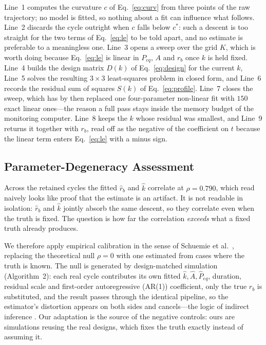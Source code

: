 \documentclass[runningheads]{llncs}
\newcommand{\rb}{\ensuremath{r_{b}}}
\newcommand{\rbh}{\ensuremath{\hat{r}_{b}}}
\newcommand{\kh}{\ensuremath{\hat{k}}}
\begin{document}
Line~1 computes the curvature
$c$ of Eq.~\eqref{eq:curv} from three points of the raw trajectory; no
model is fitted, so nothing about a fit can influence what follows.
Line~2 discards the cycle outright when $c$ falls below $c^{*}$: such a
descent is too straight for the two terms of Eq.~\eqref{eq:le} to be
told apart, and no estimate is preferable to a meaningless one.
Line~3 opens a sweep over the grid $K$, which is worth doing because
Eq.~\eqref{eq:le} is linear in $P_{eq}$, $A$ and \rb{} once $k$ is
held fixed. Line~4 builds the design matrix $D(k)$ of
Eq.~\eqref{eq:design} for the current $k$, Line~5 solves the resulting
$3\times3$ least-squares problem in closed form, and Line~6 records the
residual sum of squares $S(k)$ of Eq.~\eqref{eq:profile}. Line~7 closes
the sweep, which has by then replaced one four-parameter non-linear
fit with $150$ exact linear ones---the reason a full pass stays inside
the memory budget of the monitoring computer. Line~8 keeps the $k$
whose residual was smallest, and Line~9 returns it together with
\rb{}, read off as the negative of the coefficient on $t$ because the
linear term enters Eq.~\eqref{eq:le} with a minus sign.

\subsection{Parameter-Degeneracy Assessment}

Across the retained cycles the fitted \rbh{} and \kh{} correlate at
$\rho=0.790$, which read naively looks like proof that the estimate is
an artifact. It is not readable in isolation: \rbh{} and \kh{} jointly
absorb the same descent, so they correlate even when the truth is
fixed. The question is how far the correlation \emph{exceeds} what a
fixed truth already produces.

We therefore apply empirical calibration in the sense of Schuemie et
al.~\cite{schuemie2014interpreting}, replacing the theoretical null
$\rho=0$ with one estimated from cases where the truth is known. The
null is generated by design-matched simulation (Algorithm~2): each real
cycle contributes its own fitted $\kh,\hat{A},\hat{P}_{eq}$, duration,
residual scale and first-order autoregressive
(AR(1)) coefficient, only the true \rb{} is
substituted, and the result passes through the identical pipeline, so
the estimator's distortion appears on both sides and cancels---the
logic of indirect inference \cite{gourieroux1993indirect}. Our adaptation is the source of the negative controls: ours are
simulations reusing the real designs, which fixes the truth exactly
instead of assuming it.
\end{document}
